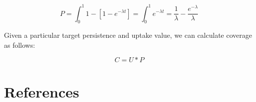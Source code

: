 \documentclass{article}
\begin{document}
\begin{equation}
P = \int_{0}^{1} 1 - [1 - e^{-\lambda t}] = \int_{0}^{1} e^{-\lambda t} =  \dfrac{1}{\lambda} - \dfrac{e^{-\lambda}}{\lambda} 
\end{equation}

Given a particular target persistence and uptake value, we can calculate coverage as follows: 

\begin{equation}
C = U * P
\end{equation}


\newpage
\section{References}



\end{document}
